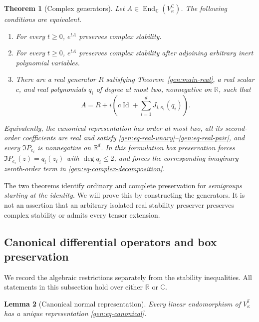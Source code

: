 \documentclass[reqno]{amsart}
\newtheorem{theorem}{Theorem}[section]
\newtheorem{lemma}[theorem]{Lemma}
\theoremstyle{definition}
\theoremstyle{remark}
\newcommand{\C}{\mathbb C}
\newcommand{\R}{\mathbb R}
\DeclareMathOperator{\Id}{Id}
\begin{document}
\begin{theorem}[Complex generators]
\label{gen:main-complex}
Let \(A\in\operatorname{End}_{\C}(V_\kappa^\C)\).  The following conditions
are equivalent.
\begin{enumerate}
\item For every \(t\geq0\), \(e^{tA}\) preserves complex stability.
\item For every \(t\geq0\), \(e^{tA}\) preserves complex stability after
adjoining arbitrary inert polynomial variables.
\item There are a real generator \(R\) satisfying
Theorem~\ref{gen:main-real}, a real scalar \(c\), and real polynomials
\(q_i\) of degree at most two, nonnegative on \(\R\), such that
\begin{equation}
 A=R+i\left(c\Id+\sum_{i=1}^dJ_{i,\kappa_i}(q_i)\right).
 \label{gen:eq-complex-decomposition}
\end{equation}
\end{enumerate}
Equivalently, the canonical representation has order at most two, all its
second-order coefficients are real and satisfy
\eqref{gen:eq-real-unary}--\eqref{gen:eq-real-pair}, and every
\(\Im P_{e_i}\) is nonnegative on \(\R^d\).  In this formulation box
preservation forces
\(\Im P_{e_i}(z)=q_i(z_i)\) with \(\deg q_i\leq2\), and forces the
corresponding imaginary zeroth-order term in
\eqref{gen:eq-complex-decomposition}.
\end{theorem}

The two theorems identify ordinary and complete preservation for
\emph{semigroups starting at the identity}.  We will prove this by constructing
the generators.  It is not an assertion that an arbitrary isolated real
stability preserver preserves complex stability or admits every tensor
extension.

\subsection{Canonical differential operators and box preservation}
\label{gen:subsec-box}

We record the algebraic restrictions separately from the stability
inequalities.  All statements in this subsection hold over either \(\R\)
or \(\C\).

\begin{lemma}[Canonical normal representation]
\label{gen:canonical}
Every linear endomorphism of \(V_\kappa^\mathbb F\) has a unique
representation \eqref{gen:eq-canonical}.
\end{lemma}
\end{document}
